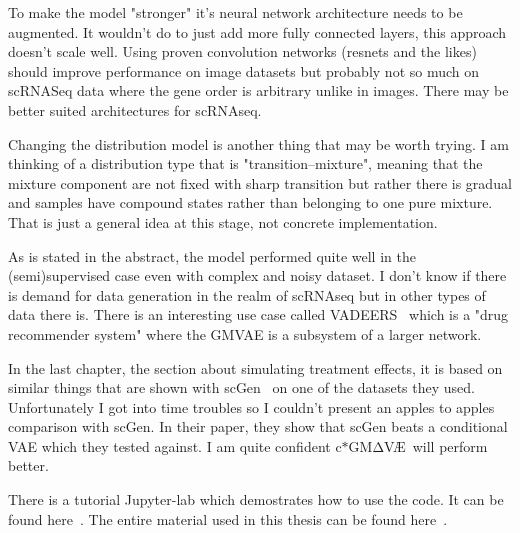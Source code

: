 \documentclass[11pt, a4paper]{report}
\theoremstyle{plain}
\theoremstyle{definition}
\theoremstyle{remark}
\newcommand{\gmvae}{c$\ast$GM$\mathrm{\Delta}$V\AE~}
\begin{document}
To make the model "stronger" it's neural network architecture needs to be
augmented. It wouldn't do to just add more fully connected layers, this approach
doesn't scale well. Using proven convolution networks (resnets and the likes)
should improve performance on image datasets but probably not so much on
scRNASeq data where the gene order is arbitrary unlike in images. There may be
better suited architectures for scRNAseq.

Changing the distribution model is another thing that may be worth trying. I am
thinking of a distribution type that is "transition--mixture", meaning that the
mixture component are not fixed with sharp transition but rather there
is gradual and samples have compound states rather than belonging to one pure
mixture. That is just a general idea at this stage, not concrete implementation.

As is stated in the abstract, the model performed quite well in the
(semi)supervised case even with complex and noisy dataset. I don't know if there
is demand for data generation in the realm of scRNAseq but in other types of
data there is. There is an interesting use case called
VADEERS~\cite{koras2022generative} which is a "drug recommender system" where 
the GMVAE is a subsystem of a larger network.

In the last chapter, the section about simulating treatment effects, it is based
on similar things that are shown with scGen~\cite{lotfollahi2019scgen} on one of
the datasets they used. Unfortunately I got into time troubles so I couldn't
present an apples to apples comparison with scGen. In their paper, they show
that scGen beats a conditional VAE which they tested against. I am quite
confident \gmvae will perform better.

There is a tutorial Jupyter-lab which demostrates how to use the code. It can be found
here~\cite{mpgvaeRepo}.
The entire material used in this thesis can be found here~\cite{mg22Repo}.


\nocite{guo2017improved}
\nocite{kingma2013auto}


\printbibliography
\end{document}

